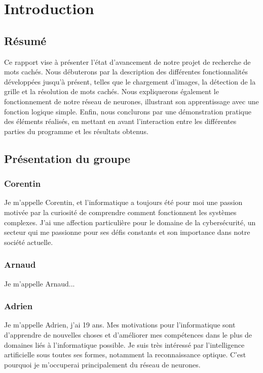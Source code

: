 \section{Introduction}

\subsection{Résumé}

\indent Ce rapport vise à présenter l’état d’avancement de notre projet de recherche de mots cachés. Nous débuterons par la description des différentes fonctionnalités développées jusqu'à présent, telles que le chargement d’images, la détection de la grille et la résolution de mots cachés. Nous expliquerons également le fonctionnement de notre réseau de neurones, illustrant son apprentissage avec une fonction logique simple. Enfin, nous conclurons par une démonstration pratique des éléments réalisés, en mettant en avant l’interaction entre les différentes parties du programme et les résultats obtenus.

\indent \newline\newline

\subsection{Présentation du groupe} \subsubsection{Corentin} \indent Je m’appelle Corentin, et l’informatique a toujours été pour moi une passion motivée par la curiosité de comprendre comment fonctionnent les systèmes complexes. J’ai une affection particulière pour le domaine de la cybersécurité, un secteur qui me passionne pour ses défis constants et son importance dans notre société actuelle.

\subsubsection{Arnaud} \indent Je m'appelle Arnaud... \newline\newline

\subsubsection{Adrien} \indent Je m'appelle Adrien, j'ai 19 ans. Mes motivations pour l'informatique sont d'apprendre de nouvelles choses et d'améliorer mes compétences dans le plus de domaines liés à l'informatique possible. Je suis très intéressé par l'intelligence artificielle sous toutes ses formes, notamment la reconnaissance optique. C'est pourquoi je m'occuperai principalement du réseau de neurones. \newline\newline

